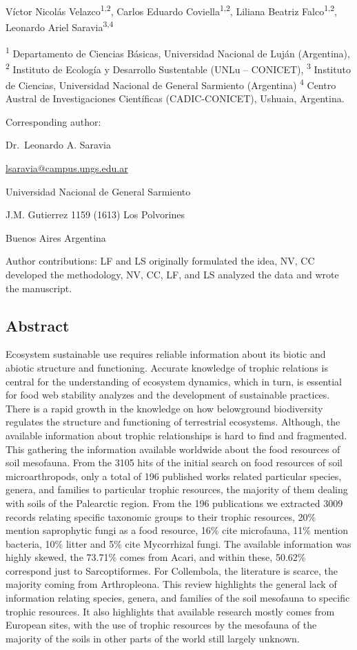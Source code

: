 \documentclass[10pt,oneside]{article}
\begin{document}
Víctor Nicolás Velazco\textsuperscript{1,2}, Carlos Eduardo
Coviella\textsuperscript{1,2}, Liliana Beatriz
Falco\textsuperscript{1,2}, Leonardo Ariel Saravia\textsuperscript{3,4}

\textsuperscript{1} Departamento de Ciencias Básicas, Universidad
Nacional de Luján (Argentina), \textsuperscript{2} Instituto de Ecología
y Desarrollo Sustentable (UNLu -- CONICET), \textsuperscript{3}
Instituto de Ciencias, Universidad Nacional de General Sarmiento
(Argentina) \textsuperscript{4} Centro Austral de Investigaciones
Científicas (CADIC-CONICET), Ushuaia, Argentina.

Corresponding author:

Dr.~Leonardo A. Saravia

\underline{lsaravia@campus.ungs.edu.ar}

Universidad Nacional de General Sarmiento

J.M. Gutierrez 1159 (1613) Los Polvorines

Buenos Aires Argentina

Author contributions: LF and LS originally formulated the idea, NV, CC
developed the methodology, NV, CC, LF, and LS analyzed the data and
wrote the manuscript.

\hypertarget{abstract}{%
\subsection{Abstract}\label{abstract}}

Ecosystem sustainable use requires reliable information about its biotic
and abiotic structure and functioning. Accurate knowledge of trophic
relations is central for the understanding of ecosystem dynamics, which
in turn, is essential for food web stability analyzes and the
development of sustainable practices. There is a rapid growth in the
knowledge on how belowground biodiversity regulates the structure and
functioning of terrestrial ecosystems. Although, the available
information about trophic relationships is hard to find and fragmented.
This gathering the information available worldwide about the food
resources of soil mesofauna. From the 3105 hits of the initial search on
food resources of soil microarthropods, only a total of 196 published
works related particular species, genera, and families to particular
trophic resources, the majority of them dealing with soils of the
Palearctic region. From the 196 publications we extracted 3009 records
relating specific taxonomic groups to their trophic resources, 20\%
mention saprophytic fungi as a food resource, 16\% cite microfauna, 11\%
mention bacteria, 10\% litter and 5\% cite Mycorrhizal fungi. The
available information was highly skewed, the 73.71\% comes from Acari,
and within these, 50.62\% correspond just to Sarcoptiformes. For
Collembola, the literature is scarce, the majority coming from
Arthropleona. This review highlights the general lack of information
relating species, genera, and families of the soil mesofauna to specific
trophic resources. It also highlights that available research mostly
comes from European sites, with the use of trophic resources by the
mesofauna of the majority of the soils in other parts of the world still
largely unknown.
\end{document}
